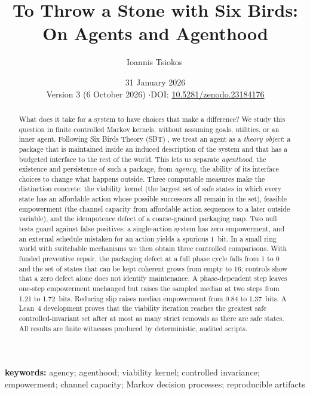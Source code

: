 \documentclass[11pt]{article}
\title{To Throw a Stone with Six Birds: On Agents and Agenthood}
\author{Ioannis Tsiokos\,\orcidlink{0009-0009-7659-5964}}
\affiliation{}
\date{31 January 2026\\[4pt]{\small Version 3 (6 October 2026) \quad$\cdot$\quad DOI: \href{https://doi.org/10.5281/zenodo.23184176}{10.5281/zenodo.23184176}}}
\makeatletter
\newcommand{\printaffiliation}{\begin{center}\small \@affiliation\end{center}}
\makeatother
\begin{document}
\maketitle
\thispagestyle{firstpage}
\printaffiliation

\begin{abstract}
What does it take for a system to have choices that make a difference? We study this question in finite controlled Markov kernels, without assuming goals, utilities, or an inner agent. Following Six Birds Theory (SBT) \citep{six_birds_theory}, we treat an agent as a \emph{theory object}: a package that is maintained inside an induced description of the system and that has a budgeted interface to the rest of the world. This lets us separate \emph{agenthood}, the existence and persistence of such a package, from \emph{agency}, the ability of its interface choices to change what happens outside. Three computable measures make the distinction concrete: the viability kernel (the largest set of safe states in which every state has an affordable action whose possible successors all remain in the set), feasible empowerment (the channel capacity from affordable action sequences to a later outside variable), and the idempotence defect of a coarse-grained packaging map. Two null tests guard against false positives: a single-action system has zero empowerment, and an external schedule mistaken for an action yields a spurious 1~bit. In a small ring world with switchable mechanisms we then obtain three controlled comparisons. With funded preventive repair, the packaging defect at a full phase cycle falls from 1 to 0 and the set of states that can be kept coherent grows from empty to 16; controls show that a zero defect alone does not identify maintenance. A phase-dependent step leaves one-step empowerment unchanged but raises the sampled median at two steps from 1.21 to 1.72~bits. Reducing slip raises median empowerment from 0.84 to 1.37~bits. A Lean~4 development proves that the viability iteration reaches the greatest safe controlled-invariant set after at most as many strict removals as there are safe states. All results are finite witnesses produced by deterministic, audited scripts.
\end{abstract}
\noindent\textbf{keywords:} agency; agenthood; viability kernel; controlled invariance; empowerment; channel capacity; Markov decision processes; reproducible artifacts














\appendix


\clearpage


\end{document}
